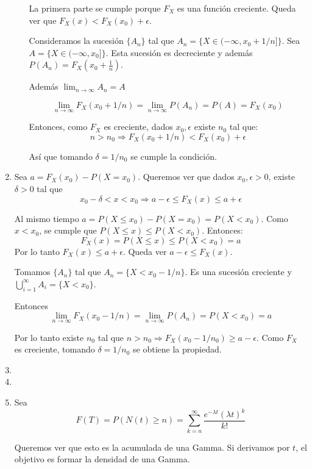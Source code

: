 \begin{enumerate}
\begin{enumerate}
					La primera parte se cumple porque $F_X$ es una función creciente. Queda ver que $F_X(x) < F_X(x_0) + \epsilon$.
					
					Consideramos la sucesión $\{A_n\}$ tal que $A_n = \{X \in (-\infty, x_0 + 1/n]\}$. Sea $A = \{X \in (-\infty, x_0]\}$.
					Esta sucesión es decreciente y además $P(A_n) = F_X(x_0+\frac{1}{n})$.
					
					Además $\lim_{n\rightarrow \infty}A_n = A$
					
					$$\lim_{n\rightarrow \infty}F_X(x_0 + 1/n) = \lim_{n\rightarrow \infty}P(A_n) = P(A) = F_X(x_0)$$
					
					Entonces, como $F_X$ es creciente, dados $x_0, \epsilon$ existe $n_0$ tal que:
					$$n > n_0 \Rightarrow F_X(x_0 + 1/n) < F_X(x_0) + \epsilon$$
					
					Así que tomando $\delta = 1/n_0$ se cumple la condición.
			\end{enumerate}
	\item
		Sea $a = F_X(x_0) - P(X=x_0)$. Queremos ver que dados $x_0, \epsilon > 0$, existe $\delta > 0$ tal que
		$$x_0 - \delta < x < x_0 \Rightarrow a - \epsilon \leq F_X(x) \leq a + \epsilon$$
		
		Al mismo tiempo $a = P(X\leq x_0) - P(X=x_0) = P(X < x_0)$.
		Como $x < x_0$, se cumple que $P(X\leq x) \leq P(X<x_0)$. Entonces:
		$$F_X(x) = P(X\leq x) \leq P(X<x_0) = a$$
		Por lo tanto $F_X(x) \leq a + \epsilon$. Queda ver $a - \epsilon \leq F_X(x)$.
		
		Tomamos $\{A_n\}$ tal que $A_n=\{X < x_0-1/n\}$. Es una sucesión creciente y $\bigcup_{i=1}^{\infty}A_i = \{X<x_0\}$.
		
		Entonces $$\lim_{n\rightarrow\infty}F_X(x_0 - 1/n) = \lim_{n\rightarrow\infty}P(A_n) = P(X < x_0) = a$$
		
		Por lo tanto existe $n_0$ tal que $n>n_0\Rightarrow F_X(x_0 - 1/n_0) \geq a - \epsilon$.
		Como $F_X$ es creciente, tomando $\delta = 1/n_0$ se obtiene la propiedad. 
	\item
		
	\item
		
	\item
		Sea $$F(T) = P(N(t) \geq n) = \sum_{k=n}^{\infty}\frac{e^{-\lambda t}(\lambda t)^k}{k!}$$
		
		Queremos ver que esto es la acumulada de una Gamma. Si derivamos por $t$, el objetivo es formar la densidad de una Gamma.
		

\end{enumerate}
